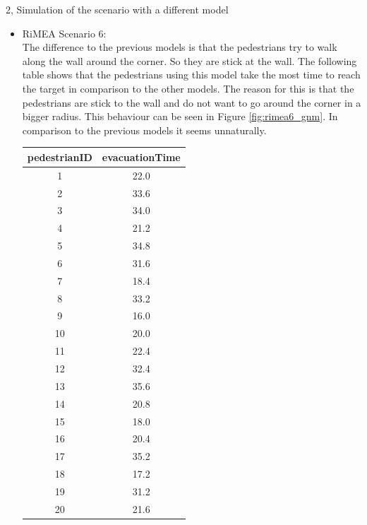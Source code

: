 \documentclass[10pt,a4paper]{article}
\begin{document}
\begin{task}{2, Simulation of the scenario with a different model}
\begin{itemize}
\begin{figure}[H]
        \caption{RiMEA scenario 1 with GNM}
        \label{fig:rimea1_gnm}
    \end{figure}
    \item RiMEA Scenario 6:\\
     The difference to the previous models is that the pedestrians try to walk along the wall around the corner. So they are stick at the wall. The following table shows that the pedestrians using this model take the most time to reach the target in comparison to the other models. The reason for this is that the pedestrians are stick to the wall and do not want to go around the corner in a bigger radius. This behaviour can be seen in Figure \ref{fig:rimea6_gnm}. In comparison to the previous models it seems unnaturally.
    \bigbreak
    \begin{tabular}{c|c}
    pedestrianID&evacuationTime\\
    \hline
         1& 22.0 \\
         2& 33.6\\
         3&34.0\\
         4&21.2\\
         5&34.8\\
         6&31.6\\
         7&18.4\\
         8&33.2\\
         9&16.0\\
         10&20.0\\
         11&22.4\\
         12&32.4\\
         13&35.6\\
         14&20.8\\
         15&18.0\\
         16&20.4\\
         17&35.2\\
         18&17.2\\
         19&31.2\\
         20&21.6\\
    \end{tabular}
    \bigbreak
    \begin{figure}[H]
        \centering

\end{figure}
\end{itemize}
\end{task}
\end{document}
